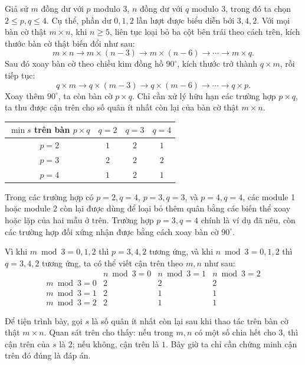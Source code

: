 \documentclass[11pt]{article}
\begin{document}
Giả sử \(m\) đồng dư với \(p\) modulo \(3\), \(n\) đồng dư với \(q\) modulo
\(3\), trong đó ta chọn \(2\le p,q\le 4\). Cụ thể, phần dư \(0,1,2\) lần lượt
được biểu diễn bởi \(3,4,2\). Với mọi bàn cờ thật \(m\times n\), khi
\(n\ge 5\), liên tục loại bỏ ba cột bên trái theo cách trên, kích thước bàn cờ
thật biến đổi như sau:
\[
  m\times n \to m\times(n-3) \to m\times(n-6) \to \cdots \to m\times q.
\]
Sau đó xoay bàn cờ theo chiều kim đồng hồ \(90^\circ\), kích thước trở thành
\(q\times m\), rồi tiếp tục:
\[
  q\times m \to q\times(m-3) \to q\times(m-6) \to \cdots \to q\times p.
\]
Xoay thêm \(90^\circ\), ta còn bàn cờ \(p\times q\). Chỉ cần xử lý hữu hạn các
trường hợp \(p\times q\), ta thu được cận trên cho số quân ít nhất còn lại của
bàn cờ thật \(m\times n\).

\begin{center}
\begin{tabular}{c|ccc}
  \(\min s\) trên bàn \(p\times q\) & \(q=2\) & \(q=3\) & \(q=4\) \\
  \hline
  \(p=2\) & \(1\) & \(2\) & \(1\) \\
  \(p=3\) & \(2\) & \(2\) & \(2\) \\
  \(p=4\) & \(1\) & \(2\) & \(1\)
\end{tabular}
\end{center}

Trong các trường hợp có \(p=2,q=4\), \(p=3,q=3\), và \(p=4,q=4\), các module
1 hoặc module 2 còn lại được dùng để loại bỏ thêm quân bằng các biến thể xoay
hoặc lặp của hai mẫu ở trên. Trường hợp \(p=3,q=4\) chính là ví dụ đã nêu,
còn các trường hợp đối xứng nhận được bằng cách xoay bàn cờ \(90^\circ\).

Vì khi \(m\bmod 3=0,1,2\) thì \(p=3,4,2\) tương ứng, và khi
\(n\bmod 3=0,1,2\) thì \(q=3,4,2\) tương ứng, ta có thể viết cận trên theo
\(m,n\) như sau:
\[
\begin{array}{c|ccc}
  & n\bmod 3=0 & n\bmod 3=1 & n\bmod 3=2 \\
  \hline
  m\bmod 3=0 & 2 & 2 & 2 \\
  m\bmod 3=1 & 2 & 1 & 1 \\
  m\bmod 3=2 & 2 & 1 & 1
\end{array}
\]

Để tiện trình bày, gọi \(s\) là số quân ít nhất còn lại sau khi thao tác trên
bàn cờ thật \(m\times n\). Quan sát trên cho thấy: nếu trong \(m,n\) có một số
chia hết cho \(3\), thì cận trên của \(s\) là \(2\); nếu không, cận trên là
\(1\). Bây giờ ta chỉ cần chứng minh cận trên đó đúng là đáp án.
\end{document}
